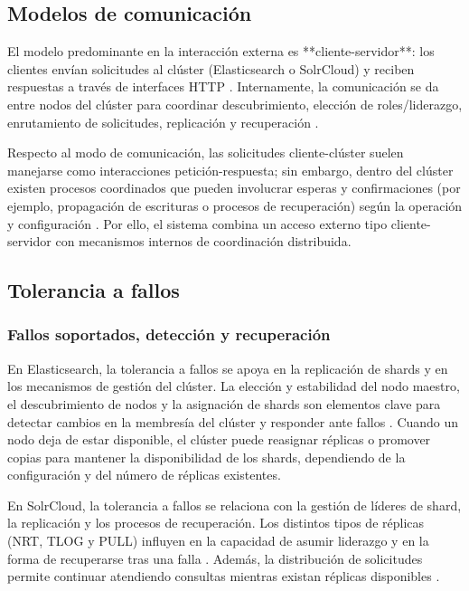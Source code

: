 \documentclass[12pt,a4paper]{article}
\begin{document}
\subsection{Modelos de comunicación}
El modelo predominante en la interacción externa es **cliente-servidor**: los clientes envían solicitudes al clúster (Elasticsearch o SolrCloud) y reciben respuestas a través de interfaces HTTP \cite{elastic_distributed_architecture,solr_distributed_requests}. Internamente, la comunicación se da entre nodos del clúster para coordinar descubrimiento, elección de roles/liderazgo, enrutamiento de solicitudes, replicación y recuperación \cite{elastic_discovery,elastic_read_write,solr_shards_indexing,solr_recoveries}.

Respecto al modo de comunicación, las solicitudes cliente-clúster suelen manejarse como interacciones petición-respuesta; sin embargo, dentro del clúster existen procesos coordinados que pueden involucrar esperas y confirmaciones (por ejemplo, propagación de escrituras o procesos de recuperación) según la operación y configuración \cite{elastic_read_write,solr_recoveries}. Por ello, el sistema combina un acceso externo tipo cliente-servidor con mecanismos internos de coordinación distribuida.

\subsection{Tolerancia a fallos}

\subsubsection{Fallos soportados, detección y recuperación}
En Elasticsearch, la tolerancia a fallos se apoya en la replicación de shards y en los mecanismos de gestión del clúster. La elección y estabilidad del nodo maestro, el descubrimiento de nodos y la asignación de shards son elementos clave para detectar cambios en la membresía del clúster y responder ante fallos \cite{elastic_discovery,elastic_nodes_shards,elastic_resilience}. Cuando un nodo deja de estar disponible, el clúster puede reasignar réplicas o promover copias para mantener la disponibilidad de los shards, dependiendo de la configuración y del número de réplicas existentes.

En SolrCloud, la tolerancia a fallos se relaciona con la gestión de líderes de shard, la replicación y los procesos de recuperación. Los distintos tipos de réplicas (NRT, TLOG y PULL) influyen en la capacidad de asumir liderazgo y en la forma de recuperarse tras una falla \cite{solr_shards_indexing,solr_recoveries}. Además, la distribución de solicitudes permite continuar atendiendo consultas mientras existan réplicas disponibles \cite{solr_distributed_requests}.
\end{document}
